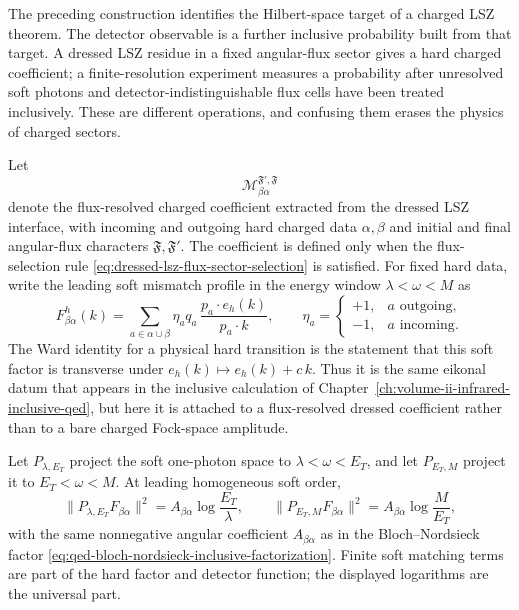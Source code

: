 The preceding construction identifies the Hilbert-space target of a charged
LSZ theorem.  The detector observable is a further inclusive probability
built from that target.  A dressed LSZ residue in a fixed angular-flux sector
gives a hard charged coefficient; a finite-resolution experiment measures a
probability after unresolved soft photons and detector-indistinguishable flux
cells have been treated inclusively.  These are different operations, and
confusing them erases the physics of charged sectors.

Let
\[
  \mathcal M^{\mathfrak F',\mathfrak F}_{\beta\alpha}
\]
denote the flux-resolved charged coefficient extracted from the dressed LSZ
interface, with incoming and outgoing hard charged data \(\alpha,\beta\) and
initial and final angular-flux characters \(\mathfrak F,\mathfrak F'\).  The
coefficient is defined only when the flux-selection rule
\eqref{eq:dressed-lsz-flux-sector-selection} is satisfied.  For fixed hard
data, write the leading soft mismatch profile in the energy window
\(\lambda<\omega<M\) as
\[
  F_{\beta\alpha}^{h}(k)
  =
  \sum_{a\in\alpha\cup\beta}
  \eta_a q_a\,
  \frac{p_a\cdot e_h(k)}{p_a\cdot k},
  \qquad
  \eta_a=
  \begin{cases}
    +1,& a\text{ outgoing},\\
    -1,& a\text{ incoming}.
  \end{cases}
\]
The Ward identity for a physical hard transition is the statement that this
soft factor is transverse under \(e_h(k)\mapsto e_h(k)+c\,k\).  Thus it is the
same eikonal datum that appears in the inclusive calculation of
Chapter~\ref{ch:volume-ii-infrared-inclusive-qed}, but here it is attached to
a flux-resolved dressed coefficient rather than to a bare charged
Fock-space amplitude.

Let \(P_{\lambda,E_T}\) project the soft one-photon space to
\(\lambda<\omega<E_T\), and let \(P_{E_T,M}\) project it to
\(E_T<\omega<M\).  At leading homogeneous soft order,
\[
  \|P_{\lambda,E_T}F_{\beta\alpha}\|^2
  =
  A_{\beta\alpha}\log\frac{E_T}{\lambda},
  \qquad
  \|P_{E_T,M}F_{\beta\alpha}\|^2
  =
  A_{\beta\alpha}\log\frac{M}{E_T},
\]
with the same nonnegative angular coefficient \(A_{\beta\alpha}\) as in the
Bloch--Nordsieck factor
\eqref{eq:qed-bloch-nordsieck-inclusive-factorization}.  Finite soft
matching terms are part of the hard factor and detector function; the
displayed logarithms are the universal part.


